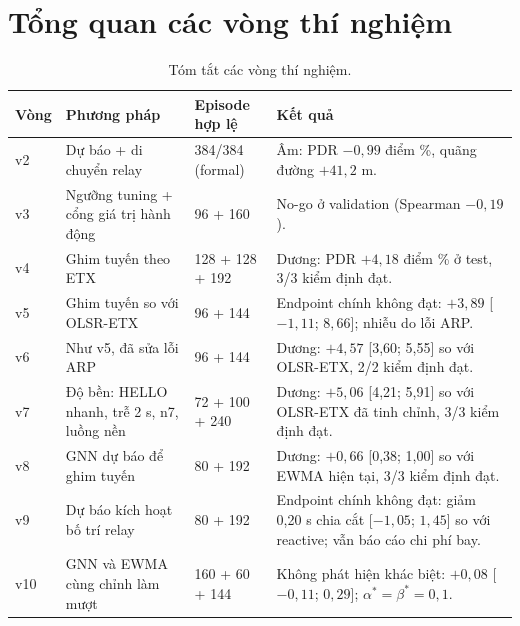 \documentclass[12pt,a4paper]{report}
\begin{document}
\section{Tổng quan các vòng thí nghiệm}
\begin{table}[H]
\centering\small
\begin{tabularx}{\linewidth}{@{}P{1.6cm}P{4.4cm}P{2.6cm}Y@{}}
\toprule\textbf{Vòng}&\textbf{Phương pháp}&\textbf{Episode hợp lệ}&\textbf{Kết quả}\\\midrule
v2&Dự báo + di chuyển relay&384/384 (formal)&Âm: PDR $-0{,}99$ điểm \%, quãng đường $+41{,}2$ m.\\
v3&Ngưỡng tuning + cổng giá trị hành động&96 + 160&No-go ở validation (Spearman $-0{,}19$).\\
v4&Ghim tuyến theo ETX&128 + 128 + 192&Dương: PDR $+4{,}18$ điểm \% ở test, 3/3 kiểm định đạt.\\
v5&Ghim tuyến so với OLSR-ETX&96 + 144&Endpoint chính không đạt: $+3{,}89$ [$-1{,}11$; $8{,}66$]; nhiễu do lỗi ARP.\\
v6&Như v5, đã sửa lỗi ARP&96 + 144&Dương: $+4{,}57$ [3,60; 5,55] so với OLSR-ETX, 2/2 kiểm định đạt.\\
v7&Độ bền: HELLO nhanh, trễ 2 s, n7, luồng nền&72 + 100 + 240&Dương: $+5{,}06$ [4,21; 5,91] so với OLSR-ETX đã tinh chỉnh, 3/3 kiểm định đạt.\\
v8&GNN dự báo để ghim tuyến&80 + 192&Dương: $+0{,}66$ [0,38; 1,00] so với EWMA hiện tại, 3/3 kiểm định đạt.\\
v9&Dự báo kích hoạt bố trí relay&80 + 192&Endpoint chính không đạt: giảm 0,20 s chia cắt [$-1{,}05$; $1{,}45$] so với reactive; vẫn báo cáo chi phí bay.\\
v10&GNN và EWMA cùng chỉnh làm mượt&160 + 60 + 144&Không phát hiện khác biệt: $+0{,}08$ [$-0{,}11$; $0{,}29$]; $\alpha^\ast=\beta^\ast=0{,}1$.\\\bottomrule
\end{tabularx}
\caption{Tóm tắt các vòng thí nghiệm.}\label{tab:overview}
\end{table}
\end{document}
